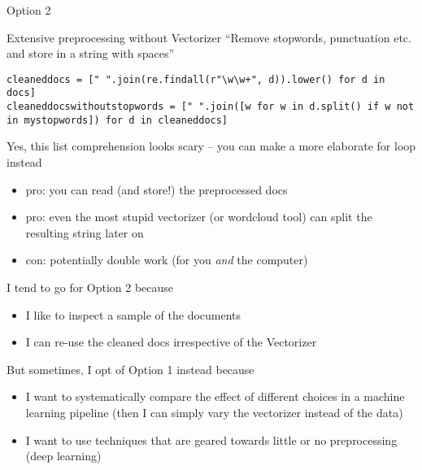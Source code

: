 \begin{frame}[fragile]{Option 2}
	\begin{block}{Extensive preprocessing without Vectorizer}
``Remove stopwords, punctuation etc. and store in a string with spaces''

\begin{lstlisting}
cleaneddocs = [" ".join(re.findall(r"\w\w+", d)).lower() for d in docs]
cleaneddocswithoutstopwords = [" ".join([w for w in d.split() if w not in mystopwords]) for d in cleaneddocs]
\end{lstlisting}
\begin{lstlistingoutputtiny}
\end{lstlistingoutputtiny}
{\tiny{Yes, this list comprehension looks scary -- you can make a more elaborate for loop instead}}
	
\begin{itemize}
	\item pro: you can read (and store!) the preprocessed docs
	\item pro: even the most stupid vectorizer (or wordcloud tool) can split the resulting string later on
	\item con: potentially double work (for you \emph{and} the computer)
\end{itemize}
\end{block}
\end{frame}



\begin{frame}[plain]
I tend to go for Option 2 because
\begin{itemize}
	\item I like to inspect a sample of the documents
	\item I can re-use the cleaned docs irrespective of the Vectorizer
\end{itemize}

But sometimes, I opt of Option 1 instead because
\begin{itemize}
	\item I want to systematically compare the effect of different choices in a machine learning pipeline (then I can simply vary the vectorizer instead of the data)
	\item I want to use techniques that are geared towards little or no preprocessing (deep learning)
\end{itemize}

\end{frame}


